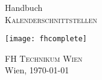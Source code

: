 \begin{titlepage}
\begin{center}

\vspace*{40mm} \huge Handbuch\\
\vspace*{10mm}
\large \textsc{Kalenderschnittstellen}

\vfill \texttt{[image: fhcomplete]}
	
\vfill \textsc{FH Technikum Wien}\\

Wien, \today
\end{center}
\end{titlepage}